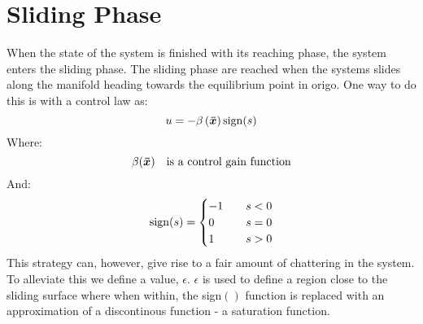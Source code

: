 \chapter{Sliding Phase}
When the state of the system is finished with its reaching phase, the system enters the sliding phase. The sliding phase are reached when the systems slides along the manifold heading towards the equilibrium point in origo. One way to do this is with a control law as:
\begin{equation}
  u = -\beta \left( \bm{\bar{x}} \right)\mathrm{sign}(s)
\end{equation}
Where:
\begin{equation}
  \beta (\bm{\bar{x}}) \quad\text{is a control gain function}
\nonumber
\end{equation}
And:
\begin{equation}
  \mathrm{sign}(s) =
  \begin{cases}
    -1 & \quad s < 0 \\
     0 & \quad s = 0 \\
     1 & \quad s > 0
  \end{cases}
\nonumber
\end{equation}
This strategy can, however, give rise to a fair amount of chattering in the system. To alleviate this we define a value, $\epsilon$. $\epsilon$ is used to define a region close to the sliding surface where when within, the sign$()$ function is replaced with an approximation of a discontinous function - a saturation function.
  
